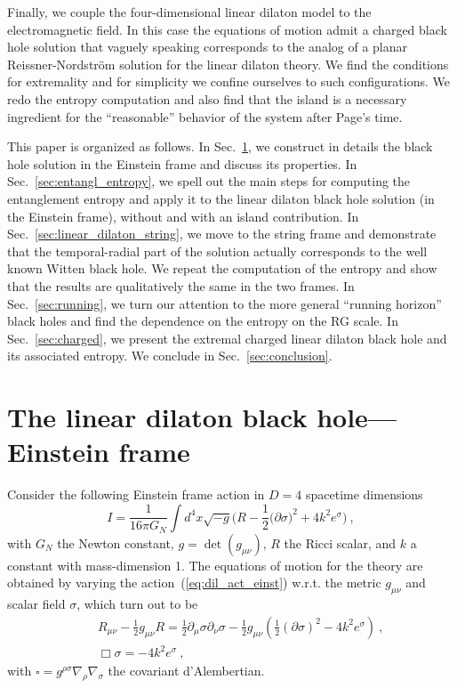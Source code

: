 \documentclass[a4paper, 12pt]{article}
\def\f{\frac}
\def\be{\begin{equation}}
\def\ee{\end{equation}}
\def\bea{\begin{eqnarray}}
\def\eea{\end{eqnarray}}
\begin{document}
Finally, we couple the four-dimensional linear dilaton model to the electromagnetic field. In this case the equations of motion admit a charged black hole solution that vaguely speaking corresponds to the analog of a planar Reissner-Nordstr\"om solution for the linear dilaton theory. We find the conditions for extremality and for simplicity we confine ourselves to such configurations. We redo the entropy computation and also find that the island is a necessary ingredient for the ``reasonable'' behavior of the system after Page's time. 

This paper is organized as follows. In Sec.~\ref{sec:linear_dilaton_Einstein}, we
construct in details the black hole solution in the Einstein frame and discuss
its properties. In
Sec.~\ref{sec:entangl_entropy}, we spell out the main steps for
computing the entanglement entropy and apply it
to the linear dilaton black hole solution (in  the Einstein frame), without and with an island contribution. In Sec.~\ref{sec:linear_dilaton_string}, we move to the string frame
and demonstrate that the temporal-radial part of the solution actually
corresponds to the well known Witten black hole. We repeat the computation of the entropy and show that the results are qualitatively the same in the two frames. In Sec.~\ref{sec:running}, we turn our attention to the more general ``running horizon'' black holes and find the dependence on the entropy on the RG scale. In Sec.~\ref{sec:charged}, we present the extremal charged linear dilaton black hole and its associated entropy. We conclude in
Sec.~\ref{sec:conclusion}. 


\section{The linear dilaton black hole---Einstein frame}
\label{sec:linear_dilaton_Einstein}


Consider the following Einstein frame action in $D=4$ spacetime dimensions
\be
\label{eq:dil_act_einst}
I=\frac{1}{16\pi G_N}\int d^4x \sqrt{-g}\bigg(R-\frac{1}{2}\big(\partial \sigma\big)^2+4 k^2 e^{\sigma}\bigg) \ ,
\ee
with $G_N$ the Newton constant, $g=\det(g_{\mu\nu})$, $R$ the Ricci scalar, and $k$ a constant with mass-dimension 1. 
The equations of motion for the theory are obtained by varying the action~(\ref{eq:dil_act_einst}) w.r.t. the metric $g_{\mu\nu}$ and scalar field $\sigma$, which turn out to be 
\bea
&&R_{\mu\nu}-\frac{1}{2}g_{\mu\nu}R=\frac{1}{2}\partial_\mu \sigma\partial_\nu \sigma-\frac{1}{2}g_{\mu\nu}\left(\f{1}{2}(\partial \sigma)^2-4 k^2 e^{\sigma}\right) \ ,\label{eq:einst_eqs_cov} \\
&& \Box \sigma=-4 k^2 e^\sigma \ , \label{eq:dil_eom_cov}
\eea
with $\square= g^{\rho\sigma}\nabla_\rho \nabla_\sigma$ the covariant d'Alembertian.  
\end{document}
